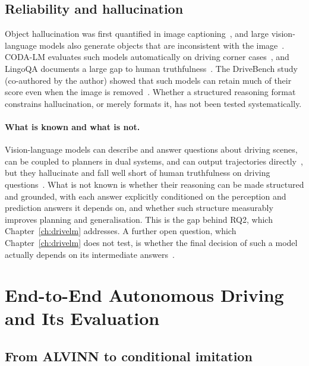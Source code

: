 \subsection{Reliability and hallucination}

Object hallucination was first quantified in image captioning~\cite{rohrbach2018object}, and large vision-language models also generate objects that are inconsistent with the image~\cite{li2023pope}. CODA-LM evaluates such models automatically on driving corner cases~\cite{chen2025codalm}, and LingoQA documents a large gap to human truthfulness~\cite{marcu2024lingoqa}. The DriveBench study (co-authored by the author) showed that such models can retain much of their score even when the image is removed~\cite{xie2025vlms}. Whether a structured reasoning format constrains hallucination, or merely formats it, has not been tested systematically.

\paragraph{What is known and what is not.} Vision-language models can describe and answer questions about driving scenes, can be coupled to planners in dual systems, and can output trajectories directly~\cite{hwang2025emma,tian2024drivevlm,renz2025simlingo}, but they hallucinate and fall well short of human truthfulness on driving questions~\cite{li2023pope,marcu2024lingoqa}. What is not known is whether their reasoning can be made structured and grounded, with each answer explicitly conditioned on the perception and prediction answers it depends on, and whether such structure measurably improves planning and generalisation. This is the gap behind RQ2, which Chapter~\ref{ch:drivelm} addresses. A further open question, which Chapter~\ref{ch:drivelm} does not test, is whether the final decision of such a model actually depends on its intermediate answers~\cite{turpin2023unfaithful}.

\section{End-to-End Autonomous Driving and Its Evaluation}\label{sec:bg:e2e}

\subsection{From ALVINN to conditional imitation}

